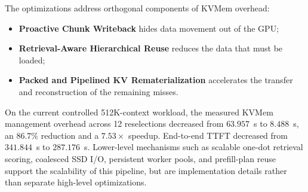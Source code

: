 The optimizations address orthogonal components of KVMem overhead:
\begin{itemize}
  \item \textbf{Proactive Chunk Writeback} hides data movement out of the GPU;
  \item \textbf{Retrieval-Aware Hierarchical Reuse} reduces the data that must
        be loaded;
  \item \textbf{Packed and Pipelined KV Rematerialization} accelerates the
        transfer and reconstruction of the remaining misses.
\end{itemize}
On the current controlled 512K-context workload, the measured KVMem management
overhead across 12 reselections decreased from \(63.957\)~s to \(8.488\)~s,
an \(86.7\%\) reduction and a \(7.53\times\) speedup.  End-to-end TTFT
decreased from \(341.844\)~s to \(287.176\)~s.  Lower-level mechanisms such as scalable one-dot
retrieval scoring, coalesced SSD I/O, persistent worker pools, and prefill-plan
reuse support the scalability of this pipeline, but are implementation details
rather than separate high-level optimizations.
